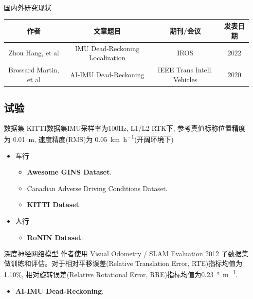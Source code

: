 \documentclass{beamer} %
\begin{document}
\begin{frame}{国内外研究现状}
    
    \begin{table}
    \tiny
        \begin{tabular}{cccc}
            \toprule
            作者 & 文章题目 & 期刊/会议 & 发表日期 \\
            \midrule
            Zhou Hang, et al & IMU Dead-Reckoning Localization\cite{zhou2022imu} & IROS & 2022 \\
            Brossard Martin, et al & AI-IMU Dead-Reckoning\cite{brossard2020ai} & IEEE Trans Intell. Vehicles & 2020 \\
            \bottomrule
        \end{tabular}
    \end{table}
\end{frame}

\subsection{试验}

\begin{frame}{数据集}
    KITTI数据集IMU采样率为100Hz, L1/L2 RTK下, 参考真值标称位置精度为 \qty{0.01}{\meter}, 速度精度(RMS)为 \qty{0.05}{\km\per\hour}(开阔环境下)
    \begin{itemize}
        \item 车行
        \begin{itemize}
            \item \textbf{Awesome GINS Dataset}\cite{Tang2022}.
            \item Canadian Adverse Driving Conditions Dataset\cite{pitropov2021canadian}.
            \item \textbf{KITTI Dataset}\cite{Geiger2013IJRR}.
        \end{itemize}
        \item 人行
        \begin{itemize}
            \item \textbf{RoNIN Dataset}\cite{herath2020ronin}.
        \end{itemize}   
    \end{itemize}
\end{frame}

\begin{frame}{深度神经网络模型}
    作者使用 Visual Odometry / SLAM Evaluation 2012 子数据集做训练和评估。对于相对平移误差(Relative Translation Error, RTE)指标均值为1.10\%, 相对旋转误差(Relative Rotational Error, RRE)指标均值为\qty{0.23}{\degree\per\metre}.
    \begin{itemize}
        \item \textbf{AI-IMU Dead-Reckoning}\cite{brossard2020ai}.
    \end{itemize}
\end{frame}
\end{document}
